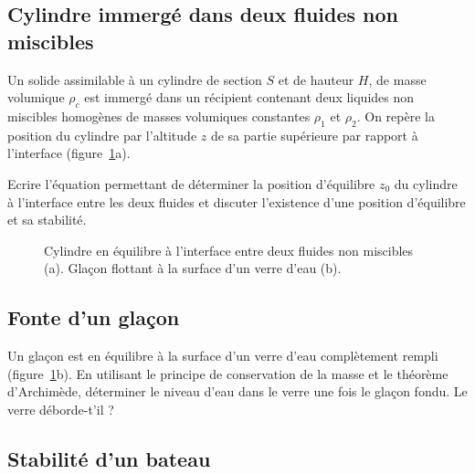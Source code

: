 {%
\subsection{Cylindre immerg\'e dans deux fluides non miscibles}

\noindent
Un solide assimilable \`a un cylindre de section $S$ et de hauteur $H$,
de masse volumique $\rho_c$ est immerg\'e dans un r\'ecipient contenant
deux liquides non miscibles homog\`enes de masses volumiques constantes
$\rho_1$ et $\rho_2$.
On rep\`ere la position du cylindre par l'altitude $z$ de sa partie
sup\'erieure par rapport \`a l'interface (figure~\ref{fig:glacon}a).

Ecrire l'\'equation permettant de d\'eterminer la position d'\'equilibre $z_0$
du cylindre \`a l'interface entre les deux fluides
et discuter l'existence d'une position d'\'equilibre et sa stabilit\'e.

\begin{figure}[htb]
\begin{center}
 \qquad 
\end{center}
\caption{Cylindre en \'equilibre \`a l'interface entre deux fluides non
miscibles (a). Gla\c{c}on flottant \`a la surface d'un verre d'eau (b).}
\label{fig:glacon}
\end{figure}

\subsection{Fonte d'un gla\c{c}on}

Un gla\c{c}on est en \'equilibre \`a la surface d'un verre d'eau 
compl\`etement rempli (figure~\ref{fig:glacon}b).
En utilisant le principe de conservation de la masse et le th\'eor\`eme
d'Archim\`ede, d\'eterminer le niveau d'eau dans le verre une fois
le gla\c{c}on fondu.
Le verre d\'eborde-t'il ?


\subsection{Stabilit\'e d'un bateau}



}

